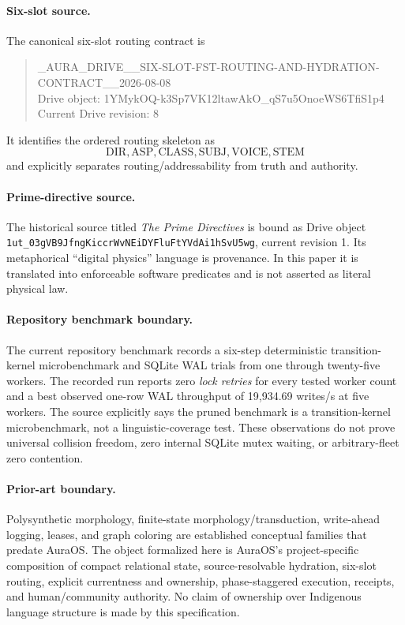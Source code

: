 \documentclass[11pt]{article}
\begin{document}
\paragraph{Six-slot source.}
The canonical six-slot routing contract is
\begin{quote}\small{}\_AURA\_DRIVE\_\_SIX-SLOT-FST-ROUTING-AND-HYDRATION-CONTRACT\_\_2026-08-08\\
Drive object: 1YMykOQ-k3Sp7VK12ltawAkO\_qS7u5OnoeWS6TfiS1p4\\
Current Drive revision: 8
\end{quote}
It identifies the ordered routing skeleton as
\[
\mathrm{DIR},\mathrm{ASP},\mathrm{CLASS},\mathrm{SUBJ},\mathrm{VOICE},\mathrm{STEM}
\]
and explicitly separates routing/addressability from truth and authority.

\paragraph{Prime-directive source.}
The historical source titled \emph{The Prime Directives} is bound as Drive object
\texttt{1ut\_03gVB9JfngKiccrWvNEiDYFluFtYVdAi1hSvU5wg}, current revision 1.
Its metaphorical ``digital physics'' language is provenance. In this paper it is translated into enforceable software predicates and is not asserted as literal physical law.

\paragraph{Repository benchmark boundary.}
The current repository benchmark records a six-step deterministic transition-kernel microbenchmark and SQLite WAL trials from one through twenty-five workers. The recorded run reports zero \emph{lock retries} for every tested worker count and a best observed one-row WAL throughput of 19,934.69 writes/s at five workers. The source explicitly says the pruned benchmark is a transition-kernel microbenchmark, not a linguistic-coverage test. These observations do not prove universal collision freedom, zero internal SQLite mutex waiting, or arbitrary-fleet zero contention.

\paragraph{Prior-art boundary.}
Polysynthetic morphology, finite-state morphology/transduction, write-ahead logging, leases, and graph coloring are established conceptual families that predate AuraOS. The object formalized here is AuraOS's project-specific composition of compact relational state, source-resolvable hydration, six-slot routing, explicit currentness and ownership, phase-staggered execution, receipts, and human/community authority. No claim of ownership over Indigenous language structure is made by this specification.
\end{document}

